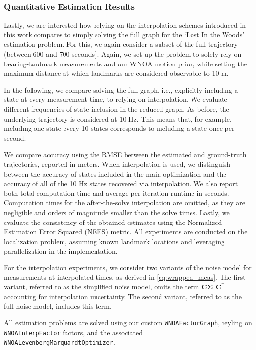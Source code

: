 \subsubsection{Quantitative Estimation Results}

Lastly, we are interested how relying on the interpolation schemes introduced in this work compares to simply solving the full graph for the `Lost In the Woods' estimation problem.
For this, we again consider a subset of the full trajectory (between 600 and 700 seconds).
Again, we set up the problem to solely rely on bearing-landmark measurements and our WNOA motion prior, while setting the maximum distance at which landmarks are considered observable to 10 m.

In the following, we compare solving the full graph, i.e., explicitly including a state at every measurement time, to relying on interpolation.
We evaluate different frequencies of state inclusion in the reduced graph.
As before, the underlying trajectory is considered at 10 Hz.
This means that, for example, including one state every 10 states corresponds to including a state once per second.

We compare accuracy using the RMSE between the estimated and ground-truth trajectories, reported in meters.
When interpolation is used, we distinguish between the accuracy of states included in the main optimization and the accuracy of all of the 10 Hz states recovered via interpolation.
We also report both total computation time and average per-iteration runtime in seconds.
Computation times for the after-the-solve interpolation are omitted, as they are negligible and orders of magnitude smaller than the solve times.
Lastly, we evaluate the consistency of the obtained estimates using the Normalized Estimation Error Squared (NEES) metric.
All experiments are conducted on the localization problem, assuming known landmark locations and leveraging parallelization in the implementation.

For the interpolation experiments, we consider two variants of the noise model for measurements at interpolated times, as derived in \eqref{eq:wrapped_meas}.
The first variant, referred to as the simplified noise model, omits the term $\mathbf{C}\boldsymbol{\Sigma}_\tau\mathbf{C}^\top$ accounting for interpolation uncertainty.
The second variant, referred to as the full noise model, includes this term.

All estimation problems are solved using our custom \texttt{WNOAFactorGraph}, reyling on \texttt{WNOAInterpFactor} factors, and the associated \\ \texttt{WNOALevenbergMarquardtOptimizer}.

